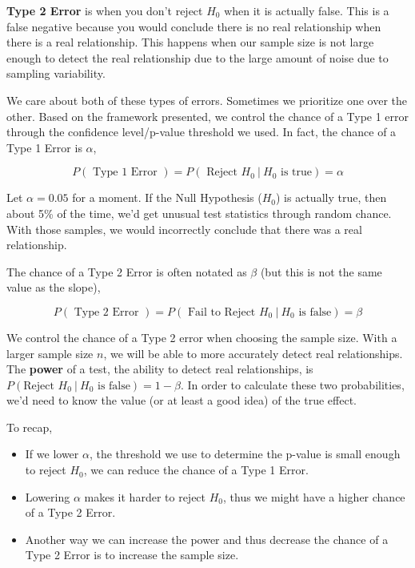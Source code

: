 \documentclass[]{book}
\providecommand{\tightlist}{%
  \setlength{\itemsep}{0pt}\setlength{\parskip}{0pt}}
\begin{document}
\textbf{Type 2 Error} is when you don't reject \(H_0\) when it is actually false. This is a false negative because you would conclude there is no real relationship when there is a real relationship. This happens when our sample size is not large enough to detect the real relationship due to the large amount of noise due to sampling variability.

We care about both of these types of errors. Sometimes we prioritize one over the other. Based on the framework presented, we control the chance of a Type 1 error through the confidence level/p-value threshold we used. In fact, the chance of a Type 1 Error is \(\alpha\),

\[P(\text{ Type 1 Error }) = P(\text{ Reject }H_0 ~|~H_0\text{ is true} ) =  \alpha\]

Let \(\alpha = 0.05\) for a moment. If the Null Hypothesis (\(H_0\)) is actually true, then about 5\% of the time, we'd get unusual test statistics through random chance. With those samples, we would incorrectly conclude that there was a real relationship.

The chance of a Type 2 Error is often notated as \(\beta\) (but this is not the same value as the slope),

\[P(\text{ Type 2 Error }) = P(\text{ Fail to Reject }H_0 ~|~H_0\text{ is false} ) =  \beta\]

We control the chance of a Type 2 error when choosing the sample size. With a larger sample size \(n\), we will be able to more accurately detect real relationships. The \textbf{power} of a test, the ability to detect real relationships, is \(P(\text{Reject }H_0 ~|~H_0\text{ is false}) = 1 - \beta\). In order to calculate these two probabilities, we'd need to know the value (or at least a good idea) of the true effect.

To recap,

\begin{itemize}
\tightlist
\item
  If we lower \(\alpha\), the threshold we use to determine the p-value is small enough to reject \(H_0\), we can reduce the chance of a Type 1 Error.
\item
  Lowering \(\alpha\) makes it harder to reject \(H_0\), thus we might have a higher chance of a Type 2 Error.
\item
  Another way we can increase the power and thus decrease the chance of a Type 2 Error is to increase the sample size.
\end{itemize}
\end{document}
